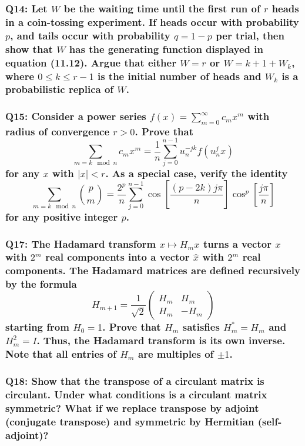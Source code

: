 \documentclass[8pt]{article}
\begin{document}
\subsubsection*{Q14:
Let \(W\) be the waiting time until the first run of \(r\) heads in a coin-tossing experiment. If heads occur with probability \(p\), and tails occur with probability \(q = 1 - p\) per trial, then show that \(W\) has the generating function displayed in equation (11.12). Argue that either \(W = r\) or \(W = k + 1 + W_k\), where \(0 \leq k \leq r - 1\) is the initial number of heads and \(W_k\) is a probabilistic replica of \(W\).}

\subsubsection*{Q15:
Consider a power series \( f(x) = \sum_{m=0}^{\infty} c_m x^m \) with radius of convergence \( r > 0 \). Prove that
\[
\sum_{m = k \mod n} c_m x^m = \frac{1}{n} \sum_{j=0}^{n-1} u_n^{-jk} f(u_n^j x)
\]
for any \( x \) with \( |x| < r \). As a special case, verify the identity
\[
\sum_{m = k \mod n} \binom{p}{m} = \frac{2^p}{n} \sum_{j=0}^{n-1} \cos \left[ \frac{(p - 2k)j\pi}{n} \right] \cos^p \left[ \frac{j\pi}{n} \right]
\]
for any positive integer \( p \).}

\subsubsection*{Q17:
The Hadamard transform \(x \mapsto H_m x\) turns a vector \(x\) with \(2^m\) real components into a vector \(\hat{x}\) with \(2^m\) real components. The Hadamard matrices are defined recursively by the formula
\[
H_{m+1} = \frac{1}{\sqrt{2}} \begin{pmatrix} H_m & H_m \\ H_m & -H_m \end{pmatrix}
\]
starting from \(H_0 = 1\). Prove that \(H_m\) satisfies \(H_m^* = H_m\) and \(H_m^2 = I\). Thus, the Hadamard transform is its own inverse. Note that all entries of \(H_m\) are multiples of \(\pm 1\).}

\subsubsection*{Q18:
Show that the transpose of a circulant matrix is circulant. Under what conditions is a circulant matrix symmetric? What if we replace transpose by adjoint (conjugate transpose) and symmetric by Hermitian (self-adjoint)?}
\end{document}
